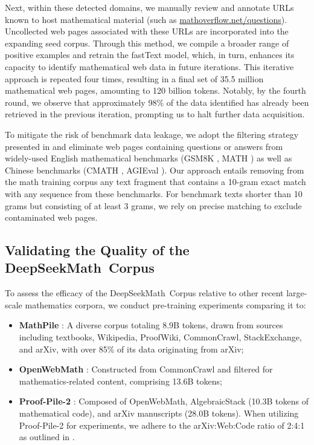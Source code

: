 Next, within these detected domains, we manually review and annotate URLs known to host mathematical material (such as \url{mathoverflow.net/questions}). Uncollected web pages associated with these URLs are incorporated into the expanding seed corpus. Through this method, we compile a broader range of positive examples and retrain the fastText model, which, in turn, enhances its capacity to identify mathematical web data in future iterations. This iterative approach is repeated four times, resulting in a final set of 35.5 million mathematical web pages, amounting to 120 billion tokens. Notably, by the fourth round, we observe that approximately 98\% of the data identified has already been retrieved in the previous iteration, prompting us to halt further data acquisition.

To mitigate the risk of benchmark data leakage, we adopt the filtering strategy presented in \cite{deepseek-coder} and eliminate web pages containing questions or answers from widely-used English mathematical benchmarks (GSM8K \citep{gsm8k}, MATH \citep{MATH}) as well as Chinese benchmarks (CMATH \citep{wei2023cmath}, AGIEval \citep{agieval}). Our approach entails removing from the math training corpus any text fragment that contains a 10-gram exact match with any sequence from these benchmarks. For benchmark texts shorter than 10 grams but consisting of at least 3 grams, we rely on precise matching to exclude contaminated web pages.

\subsection{Validating the Quality of the DeepSeekMath~Corpus}

To assess the efficacy of the DeepSeekMath~Corpus relative to other recent large-scale mathematics corpora, we conduct pre-training experiments comparing it to:

\begin{itemize}[topsep=0pt]
    \item \textbf{MathPile} \citep{mathpile}: A diverse corpus totaling 8.9B tokens, drawn from sources including textbooks, Wikipedia, ProofWiki, CommonCrawl, StackExchange, and arXiv, with over 85\% of its data originating from arXiv;
    \item \textbf{OpenWebMath} \citep{openwebmath}: Constructed from CommonCrawl and filtered for mathematics-related content, comprising 13.6B tokens;
    \item \textbf{Proof-Pile-2} \citep{llemma}: Composed of OpenWebMath, AlgebraicStack (10.3B tokens of mathematical code), and arXiv manuscripts (28.0B tokens). When utilizing Proof-Pile-2 for experiments, we adhere to the arXiv:Web:Code ratio of 2:4:1 as outlined in \cite{llemma}.
\end{itemize}

